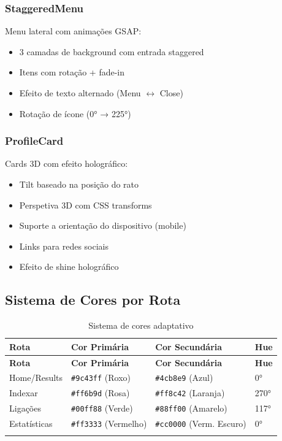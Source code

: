 \documentclass[12pt,a4paper]{article}
\begin{document}
\subsubsection{StaggeredMenu}
Menu lateral com animações GSAP:
\begin{itemize}
    \item 3 camadas de background com entrada staggered
    \item Itens com rotação + fade-in
    \item Efeito de texto alternado (Menu $\leftrightarrow$ Close)
    \item Rotação de ícone (0° → 225°)
\end{itemize}

\subsubsection{ProfileCard}
Cards 3D com efeito holográfico:
\begin{itemize}
    \item Tilt baseado na posição do rato
    \item Perspetiva 3D com CSS transforms
    \item Suporte a orientação do dispositivo (mobile)
    \item Links para redes sociais
    \item Efeito de shine holográfico
\end{itemize}

\subsection{Sistema de Cores por Rota}

\begin{longtable}{|p{3cm}|p{4cm}|p{5cm}|p{2cm}|}
\hline
\textbf{Rota} & \textbf{Cor Primária} & \textbf{Cor Secundária} & \textbf{Hue} \\
\hline
\endfirsthead
\hline
\textbf{Rota} & \textbf{Cor Primária} & \textbf{Cor Secundária} & \textbf{Hue} \\
\hline
\endhead
\hline
\endfoot

Home/Results & \texttt{\#9c43ff} (Roxo) & \texttt{\#4cb8e9} (Azul) & 0° \\
Indexar & \texttt{\#ff6b9d} (Rosa) & \texttt{\#ff8c42} (Laranja) & 270° \\
Ligações & \texttt{\#00ff88} (Verde) & \texttt{\#88ff00} (Amarelo) & 117° \\
Estatísticas & \texttt{\#ff3333} (Vermelho) & \texttt{\#cc0000} (Verm. Escuro) & 0° \\
\hline
\caption{Sistema de cores adaptativo}
\end{longtable}
\end{document}
